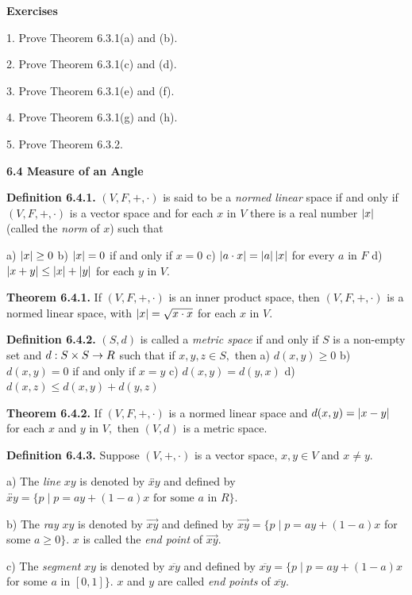 \textbf{Exercises} \nl

1. Prove Theorem 6.3.1(a) and (b). \nl

2. Prove Theorem 6.3.1(c) and (d).\nl

3. Prove Theorem 6.3.1(e) and (f).\nl

4. Prove Theorem 6.3.1(g) and (h).\nl

5. Prove Theorem 6.3.2. \nl

\newpage
\textbf{6.4 Measure of an Angle}\nl

\textbf{Definition 6.4.1.} $(V,F,+,\cdot)$ is said to be a \textit{normed linear} space if and only if $(V,F,+,\cdot)$ is a vector space and for each $x$ in $V$ there is a real num­ber $\left|x\right|$ (called the \textit{norm} of $x$) such that \nl

a) $\left|x\right| \geq 0$\nl
b) $\left|x\right| = 0$ if and only if $x = 0$\nl
c) $\left|a\cdot x\right| = \left|a\right|\left|x\right|$ for every $a$ in $F$ \nl
d) $\left|x + y\right| \leq \left|x\right| + \left|y\right|$ for each $y$ in $V$.\nl


\textbf{Theorem 6.4.1.} If $(V,F,+,\cdot)$ is an inner product space, then $(V,F,+,\cdot )$ is a normed linear
space, with $\left|x\right|= \sqrt{x\cdot x}$ for each $x$ in $V.$ \nl

\textbf{Definition 6.4.2.} $(S,d)$ is called a \textit{metric space} if and only if $S$ is a non-empty set and $d : S\times S\to R$ such that if $x,y,z\in S,$ then \nl
a) $d(x,y) \geq 0$\nl
b) $d(x,y) = 0$ if and only if $x = y$\nl
c) $d(x,y) = d(y,x)$\nl
d) $d(x,z) \leq d(x,y) + d(y,z)$\nl

\textbf{Theorem 6.4.2.} If $(V,F,+,\cdot)$ is a normed linear space and $d(x,y) = \left|x - y\right|$ for each $x$ and $y$ in $V,$ then $(V,d)$ is a metric space. \nl

\textbf{Definition 6.4.3.} Suppose $(V,+,\cdot)$ is a vector space, $x,y\in V$ and $x \neq y.$\nl

a) The \textit{line} $xy$ is denoted by $\overleftrightarrow{xy}$ and defined by $\overleftrightarrow{xy} = \{p \mid p = ay + (1-a)x\text{~for~some~} a \text{~in~} R\}.$ \nl

b) The \textit{ray} $xy$ is denoted by $\overrightarrow{xy}$ and defined by $\overrightarrow{xy} = \{p \mid p =ay +( 1 - a)x$ for some $a\geq 0\}.$ $x$ is called the \textit{end point} of $\overrightarrow{xy}.$ \nl

c) 	The \textit{segment} $xy$ is denoted by $\overline{xy}$ and defined by $\overline{xy}  =\{p \mid p = ay + (1 - a)x$ for some $a$ in $[0,1] \}.$ $x$ and $y$ are called \textit{end points} of $\overline{xy}.$ \nl


